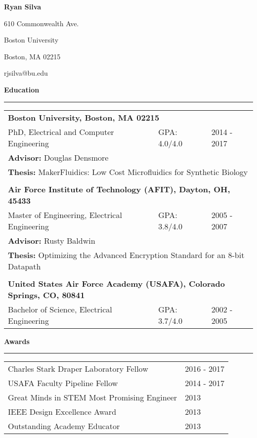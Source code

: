 
{\centering
\Large
\textbf{Ryan Silva}

\normalsize
610 Commonwealth Ave.

Boston University

Boston, MA 02215

rjsilva@bu.edu\\[1cm]
}
\large
\textbf{Education}\\
\rule{\textwidth}{1pt}

\begin{table}[h!]
\centering
\small
\begin{tabular}{ p{9.5cm} p{2.5cm} p{4.5cm}}
	\multicolumn{3}{l}{\textbf{Boston University, Boston, MA 02215}}\\
	PhD, Electrical and Computer Engineering & GPA: 4.0/4.0 & 2014 - 2017\\
	\multicolumn{3}{l}{\textbf{Advisor: }Douglas Densmore}\\
	\multicolumn{3}{l}{\textbf{Thesis: }MakerFluidics: Low Cost Microfluidics for Synthetic Biology}\\
	 & & \\
	\multicolumn{3}{l}{\textbf{Air Force Institute of Technology (AFIT), Dayton, OH, 45433}}\\
	Master of Engineering, Electrical Engineering & GPA: 3.8/4.0 & 2005 - 2007\\
	\multicolumn{3}{l}{\textbf{Advisor: }Rusty Baldwin}\\
	\multicolumn{3}{l}{\textbf{Thesis: }Optimizing the Advanced Encryption Standard for an 8-bit Datapath}\\
	 & & \\
	\multicolumn{3}{l}{\textbf{United States Air Force Academy (USAFA), Colorado Springs, CO, 80841}}\\
	Bachelor of Science, Electrical Engineering & GPA: 3.7/4.0 & 2002 - 2005\\
\end{tabular}
\end{table}

\large
\textbf{Awards}\\
\rule{\textwidth}{1pt}

\begin{table}[h!]
\centering
\small
\begin{tabular}{ p{12.5cm} p{4.5cm}}
	Charles Stark Draper Laboratory Fellow & 2016 - 2017 \\
	USAFA Faculty Pipeline Fellow & 2014 - 2017 \\
	Great Minds in STEM Most Promising Engineer & 2013 \\
	IEEE Design Excellence Award & 2013 \\
	Outstanding Academy Educator & 2013
\end{tabular}
\end{table}


